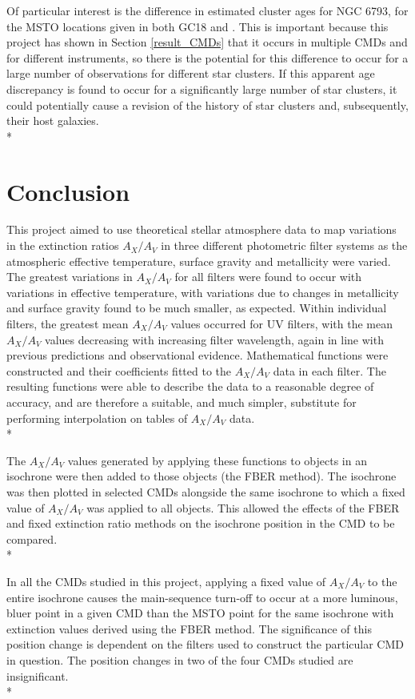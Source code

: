 \documentclass[12pt, a4paper]{report}
\begin{document}
Of particular interest is the difference in estimated cluster ages for NGC 6793, for the MSTO locations given in both GC18 and \citep{2019A&A...623A.108B}. This is important because this project has shown in Section \ref{result_CMDs} that it occurs in multiple CMDs and for different instruments, so there is the potential for this difference to occur for a large number of observations for different star clusters. If this apparent age discrepancy is found to occur for a significantly large number of star clusters, it could potentially cause a revision of the history of star clusters and, subsequently, their host galaxies. \\*

\chapter{Conclusion}
This project aimed to use theoretical stellar atmosphere data to map variations in the extinction ratios $A_{X}/A_{V}$ in three different photometric filter systems as the atmospheric effective temperature, surface gravity and metallicity were varied. The greatest variations in $A_{X}/A_{V}$ for all filters were found to occur with variations in effective temperature, with variations due to changes in metallicity and surface gravity found to be much smaller, as expected. Within individual filters, the greatest mean $A_{X}/A_{V}$ values occurred for UV filters, with the mean $A_{X}/A_{V}$ values decreasing with increasing filter wavelength, again in line with previous predictions and observational evidence. Mathematical functions were constructed and their coefficients fitted to the $A_{X}/A_{V}$ data in each filter. The resulting functions were able to describe the data to a reasonable degree of accuracy, and are therefore a suitable, and much simpler, substitute for performing interpolation on tables of $A_{X}/A_{V}$ data. \\* 

The $A_{X}/A_{V}$ values generated by applying these functions to objects in an isochrone were then added to those objects (the FBER method). The isochrone was then plotted in selected CMDs alongside the same isochrone to which a fixed value of $A_{X}/A_{V}$ was applied to all objects. This allowed the effects of the FBER and fixed extinction ratio methods on the isochrone position in the CMD to be compared. \\*

In all the CMDs studied in this project, applying a fixed value of $A_{X}/A_{V}$ to the entire isochrone causes the main-sequence turn-off to occur at a more luminous, bluer point in a given CMD than the MSTO point for the same isochrone with extinction values derived using the FBER method. The significance of this position change is dependent on the filters used to construct the particular CMD in question. The position changes in two of the four CMDs studied are insignificant.\\*
\end{document}
